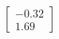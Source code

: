\documentclass[preview]{standalone}
\begin{document}
\begin{align*}
\begin{bmatrix} -0.32 \\ 1.69 \end{bmatrix}
\end{align*}
\end{document}
